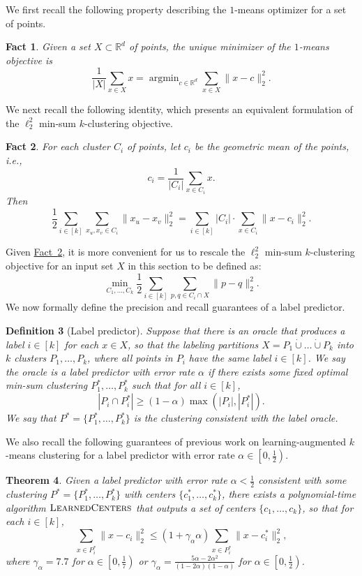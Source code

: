 \documentclass[11pt]{article}
\newtheorem{theorem}{Theorem}[section]
\newtheorem{definition}[theorem]{Definition}
\newtheorem{fact}[theorem]{Fact}
\newcommand{\namedref}[2]{\hyperref[#2]{#1~\ref*{#2}}}
\newcommand{\thmlab}[1]{\label{thm:#1}}
\newcommand{\factlab}[1]{\label{fact:#1}}
\newcommand{\factref}[1]{\namedref{Fact}{fact:#1}}
\newcommand{\deflab}[1]{\label{def:#1}}
\def \LearnedCenters    {\mdef{\textsc{LearnedCenters}}}
\newcommand{\mdef}[1]{{\ensuremath{#1}}\xspace}  %
\DeclareMathOperator*{\argmin}{argmin}
\begin{document}
We first recall the following property describing the $1$-means optimizer for a set of points. 
\begin{fact}
\factlab{fact:means:center}
\cite{InabaKI94}
Given a set $X\subset\mathbb{R}^d$ of points, the unique minimizer of the $1$-means objective is 
\[\frac{1}{|X|}\sum_{x\in X}x=\argmin_{c\in\mathbb{R}^d}\sum_{x\in X}\|x-c\|_2^2.\]
\end{fact}
We next recall the following identity, which presents an equivalent formulation of the $\ell_2^2$ min-sum $k$-clustering objective. 
\begin{fact}
\cite{InabaKI94}
\factlab{fact:minsum}
For each cluster $C_i$ of points, let $c_i$ be the geometric mean of the points, i.e., 
\[c_i=\frac{1}{|C_i|}\sum_{x\in C_i} x.\]
Then
\[\frac{1}{2}\sum_{i\in[k]}\sum_{x_u,x_v\in C_i}\|x_u-x_v\|_2^2=\sum_{i\in[k]}|C_i|\cdot\sum_{x\in C_i}\|x-c_i\|_2^2.\]
\end{fact}
Given \factref{fact:minsum}, it is more convenient for us to rescale the $\ell_2^2$ min-sum $k$-clustering objective for an input set $X$ in this section to be defined as:
\[\min_{C_1,\ldots,C_k}\frac{1}{2}\sum_{i\in[k]}\sum_{p,q\in C_i\cap X}\|p-q\|_2^2.\]
We now formally define the precision and recall guarantees of a label predictor. 
\begin{definition}[Label predictor]
\deflab{def:label:oracle}
Suppose that there is an oracle that produces a label $i\in[k]$ for each $x\in X$, so that the labeling partitions $X=P_1\dot\cup\ldots\dot\cup P_k$ into $k$ clusters $P_1,\ldots,P_k$, where all points in $P_i$ have the same label $i\in[k]$. 
We say the oracle is a \emph{label predictor with error rate} $\alpha$ if there exists some fixed optimal min-sum clustering $P^*_1,\ldots,P^*_k$ such that for all $i\in[k]$,
\[|P_i\cap P^*_i|\ge(1-\alpha)\max(|P_i|,|P^*_i|).\]
We say that $P^*=\{P^*_1,\ldots,P^*_k\}$ is the clustering consistent with the label oracle. 
\end{definition}
We also recall the following guarantees of previous work on learning-augmented $k$-means clustering for a label predictor with error rate $\alpha\in\left[0,\frac{1}{2}\right)$. 
\begin{theorem}
\cite{NguyenCN23}
\thmlab{thm:each:cluster}
Given a label predictor with error rate $\alpha<\frac{1}{2}$ consistent with some clustering $P^*=\{P^*_1,\ldots,P^*_k\}$ with centers $\{c^*_1,\ldots,c^*_k\}$, there exists a polynomial-time algorithm $\LearnedCenters$ that outputs a set of centers $\{c_1,\ldots,c_k\}$, so that for each $i\in[k]$,
\[\sum_{x\in P^*_i}\|x-c_i\|_2^2\le(1+\gamma_\alpha\alpha)\sum_{x\in P^*_i}\|x-c^*_i\|_2^2,\]
where $\gamma_\alpha=7.7$ for $\alpha\in\left[0,\frac{1}{7}\right)$ or $\gamma_\alpha=\frac{5\alpha-2\alpha^2}{(1-2\alpha)(1-\alpha)}$ for $\alpha\in\left[0,\frac{1}{2}\right)$. 
\end{theorem}
\end{document}

